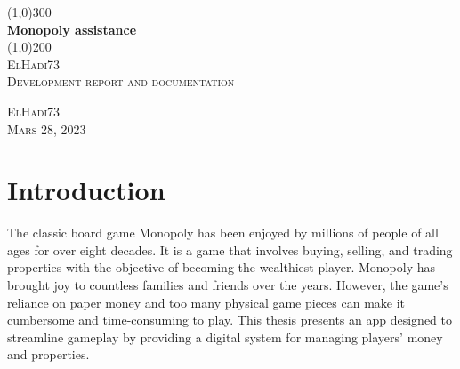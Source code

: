 \documentclass{article}
\begin{document}
\begin{titlepage}
	\begin{center}
		\line(1,0){300}\\
		[0.25in]
		\huge{\bfseries Monopoly assistance}\\
		[2mm]
		\line(1,0){200}\\
		[1.5cm]
		\textsc{\LARGE ElHadi73}\\
		[0.75cm]
		\textsc{\Large Development report and documentation}\\
		[10cm]
	\end{center}
	\begin{flushright}
		\textsc{\large ElHadi73\\
		Mars 28, 2023\\}
	\end{flushright}
\end{titlepage}

\section{Introduction}\label{sec:intro}
        The classic board game Monopoly has been enjoyed by millions of people of all ages for over eight decades. It is a game that involves buying, selling, and trading properties with the objective of becoming the wealthiest
player.
        Monopoly has brought joy to countless families and friends over the years. However, the game's reliance on paper money and too many physical game pieces can make it cumbersome and time-consuming to play. 
        This thesis presents an app designed to streamline gameplay by providing a digital system for managing players' money and properties.
\end{document}
